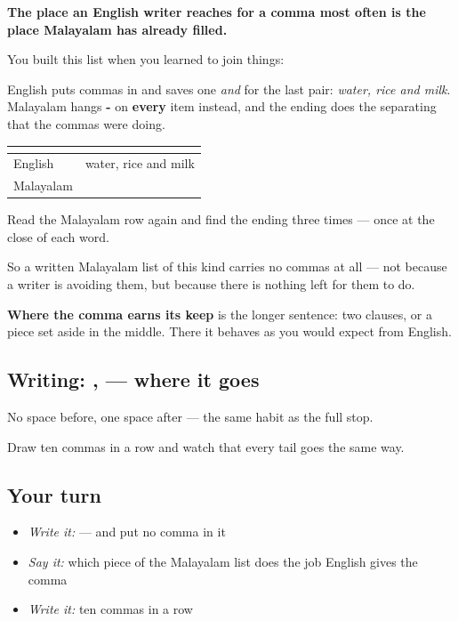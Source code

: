 \begin{grammarlens}[title={Grammar Lens: what your own list does instead}]
\textbf{The place an English writer reaches for a comma most often is the place Malayalam has already filled.}

You built this list when you learned to join things:

\begin{quote}
\textbf{  }
\end{quote}

English puts commas in and saves one \emph{and} for the last pair: \emph{water, rice and milk}. Malayalam hangs \textbf{-} on \textbf{every} item instead, and the ending does the separating that the commas were doing.

\noindent
\begin{tabularx}{\linewidth}{@{}>{\raggedright\arraybackslash}X>{\raggedright\arraybackslash}X@{}}
\toprule
\textbf{} & \textbf{} \\
\midrule
English & water, rice and milk \\
Malayalam & \ml{വെള്ളവും} \ml{അരിയും} \ml{പാലും} \\
\bottomrule
\end{tabularx}

Read the Malayalam row again and find the ending three times — once at the close of each word.

So a written Malayalam list of this kind carries no commas at all — not because a writer is avoiding them, but because there is nothing left for them to do.

\textbf{Where the comma earns its keep} is the longer sentence: two clauses, or a piece set aside in the middle. There it behaves as you would expect from English.
\end{grammarlens}

\subsection*{Writing: , — where it goes}
No space before, one space after — the same habit as the full stop.

Draw ten commas in a row and watch that every tail goes the same way.

\subsection*{Your turn}
\begin{itemize}
\raggedright
  \item \emph{Write it:} \textbf{  } — and put no comma in it
  \item \emph{Say it:} which piece of the Malayalam list does the job English gives the comma
  \item \emph{Write it:} ten commas in a row
\end{itemize}

